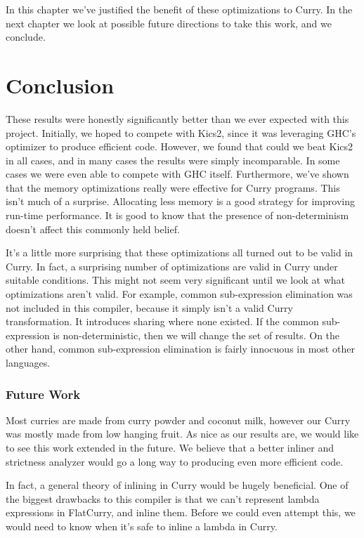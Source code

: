 \documentclass{book}
\theoremstyle{definition}
\begin{document}
In this chapter we've justified the benefit of these optimizations to Curry.
In the next chapter we look at possible future directions to take this work, and we conclude.



\chapter{Conclusion} \label{ch:Conclusion}




These results were honestly significantly better than we ever expected with this project.
Initially, we hoped to compete with Kics2, since it was leveraging GHC's optimizer
to produce efficient code.
However, we found that could we beat Kics2 in all cases,
and in many cases the results were simply incomparable.
In some cases we were even able to compete with GHC itself.
Furthermore, we've shown that the memory optimizations really were effective for Curry programs.
This isn't much of a surprise.
Allocating less memory is a good strategy for improving run-time performance.
It is good to know that the presence of non-determinism doesn't affect this commonly held belief.

It's a little more surprising that these optimizations all turned out to be valid in Curry.
In fact, a surprising number of optimizations are valid in Curry under suitable conditions.
This might not seem very significant until we look at what optimizations aren't valid.
For example, common sub-expression elimination was not included in this compiler,
because it simply isn't a valid Curry transformation.
It introduces sharing where none existed.
If the common sub-expression is non-deterministic, then we will change the set of results.
On the other hand, common sub-expression elimination is fairly innocuous in most other languages.

\subsection{Future Work}

Most curries are made from curry powder and coconut milk,
however our Curry was mostly made from low hanging fruit.
As nice as our results are,
we would like to see this work extended in the future.
We believe that a better inliner and strictness analyzer
would go a long way to producing even more efficient code.

In fact, a general theory of inlining in Curry would be hugely beneficial.
One of the biggest drawbacks to this compiler is that we can't represent 
lambda expressions in FlatCurry, and inline them.
Before we could even attempt this,
we would need to know when it's safe to inline a lambda in Curry.
\end{document}
